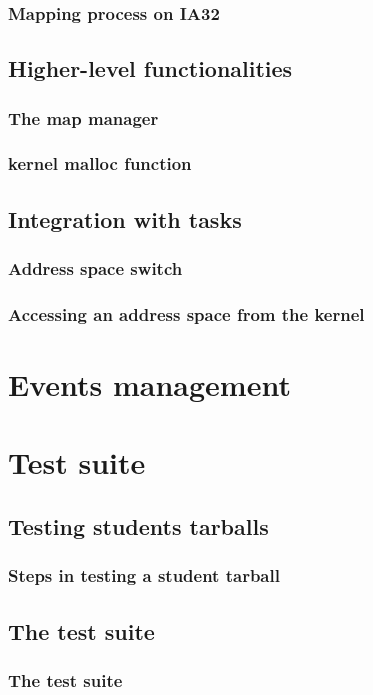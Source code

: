 
\begin{frame}
  \frametitle{Mapping process on IA32}
\end{frame}

%
%

\subsection{Higher-level functionalities}


\begin{frame}
  \frametitle{The map manager}
\end{frame}


\begin{frame}
  \frametitle{kernel malloc function}
\end{frame}

%
%

\subsection{Integration with tasks}


\begin{frame}
  \frametitle{Address space switch}
\end{frame}


\begin{frame}
  \frametitle{Accessing an address space from the kernel}
\end{frame}

%
%

\section{Events management}

%
%

\section{Test suite}

%
%

\subsection{Testing students tarballs}


\begin{frame}
  \frametitle{Steps in testing a student tarball}
\end{frame}

%
%

\subsection{The test suite}


\begin{frame}
  \frametitle{The test suite}
\end{frame}


